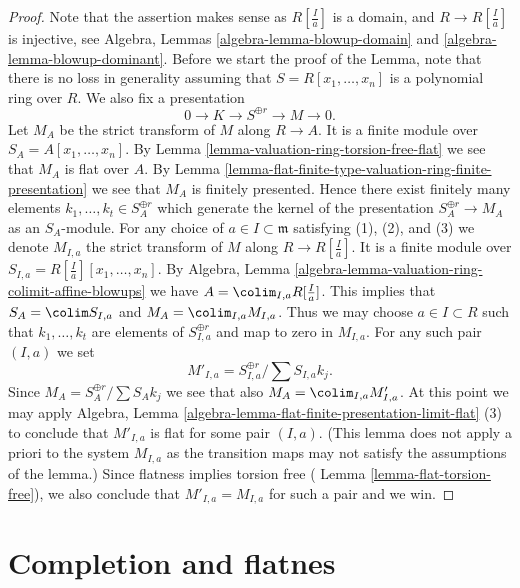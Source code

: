 \begin{proof}
Note that the assertion makes sense as $R[\frac{I}{a}]$
is a domain, and $R \to R[\frac{I}{a}]$ is injective, see
Algebra, Lemmas \ref{algebra-lemma-blowup-domain} and
\ref{algebra-lemma-blowup-dominant}.
Before we start the proof of the Lemma, note that there is
no loss in generality assuming that $S = R[x_1, \ldots, x_n]$
is a polynomial ring over $R$. We also fix a presentation
$$
0 \to K \to S^{\oplus r} \to M \to 0.
$$
Let $M_A$ be the strict transform of $M$ along $R \to A$. It is a finite
module over $S_A = A[x_1, \ldots, x_n]$. By
Lemma \ref{lemma-valuation-ring-torsion-free-flat}
we see that $M_A$ is flat over $A$. By
Lemma \ref{lemma-flat-finite-type-valuation-ring-finite-presentation}
we see that $M_A$ is finitely presented. Hence there exist finitely many
elements $k_1, \ldots, k_t \in S_A^{\oplus r}$ which generate the
kernel of the presentation $S_A^{\oplus r} \to M_A$ as
an $S_A$-module. For any choice of $a \in I \subset \mathfrak m$
satisfying (1), (2), and (3) we denote $M_{I, a}$ the strict transform of
$M$ along $R \to R[\frac{I}{a}]$. It is a finite module over
$S_{I, a} = R[\frac{I}{a}][x_1, \ldots, x_n]$. By
Algebra, Lemma \ref{algebra-lemma-valuation-ring-colimit-affine-blowups}
we have $A = \colim_{I, a} R[\frac{I}{a}]$.
This implies that $S_A = \colim S_{I, a}$ and
$M_A = \colim_{I, a} M_{I, a}$.
Thus we may choose $a \in I \subset R$ such that
$k_1, \ldots, k_t$ are elements of $S_{I, a}^{\oplus r}$ and
map to zero in $M_{I, a}$. For any such pair $(I, a)$ we set
$$
M'_{I, a} = S_{I, a}^{\oplus r}/ \sum S_{I, a}k_j.
$$
Since $M_A = S_A^{\oplus r}/ \sum S_Ak_j$ we see that also
$M_A = \colim_{I, a} M'_{I, a}$.
At this point we may apply
Algebra, Lemma \ref{algebra-lemma-flat-finite-presentation-limit-flat} (3)
to conclude that $M'_{I, a}$ is flat for some pair $(I, a)$.
(This lemma does not apply a priori to the system $M_{I, a}$
as the transition maps may not satisfy the assumptions of the lemma.)
Since flatness implies torsion free (
Lemma \ref{lemma-flat-torsion-free}),
we also conclude that $M'_{I, a} = M_{I, a}$ for such a pair and we win.
\end{proof}












\section{Completion and flatnes}
\label{section-completion-flat}

